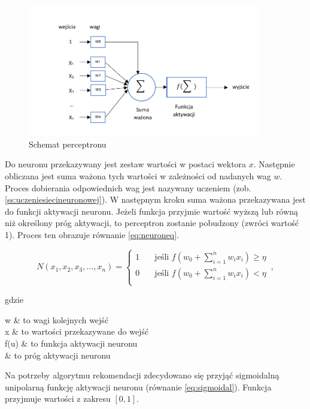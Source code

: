 \documentclass[twoside]{iisthesis}
\begin{document}
 		 \begin{figure}[!ht] 		 		 	
	 		 	\includegraphics[width=0.9\textwidth]{schematneuron}
	 		 	\caption{Schemat perceptronu}
	 		 	\label{fig:schematneuronu}
 		 \end{figure}
		 
		 Do neuronu przekazywany jest zestaw wartości w postaci wektora $x$. Następnie obliczana jest suma ważona tych wartości w zależności od nadanych wag $w$. Proces dobierania odpowiednich wag jest nazywany uczeniem (zob. \ref{ss:uczeniesiecineuronowej}). W następnym kroku suma ważona przekazywana jest do funkcji aktywacji neuronu. Jeżeli funkcja przyjmie wartość wyższą lub równą niż określony próg aktywacji, to perceptron zostanie pobudzony (zwróci wartość 1). Proces ten obrazuje równanie \ref{eq:neuroneq}.
		 
		 \begin{equation}
		 \label{eq:neuroneq}
		 N(x_1, x_2, x_3, \ldots, x_n) = 
			 \begin{cases}
			 1       & \quad \text{jeśli } f(w_0 + \sum_{i=1}^{n}w_ix_i) \geq \eta\\
			 0		 & \quad \text{jeśli } f(w_0 + \sum_{i=1}^{n}w_ix_i) < \eta\\
			 \end{cases}
		 \,,
		 \end{equation}
		 
		 gdzie
		 
		 \begin{conditions*}
		 	w & to wagi kolejnych wejść \\
		 	x & to wartości przekazywane do wejść \\
		 	f(u) & to funkcja aktywacji neuronu \\
		 	\eta & to próg aktywacji neuronu
		 \end{conditions*} 
		 
		 Na potrzeby algorytmu rekomendacji zdecydowano się przyjąć sigmoidalną unipolarną funkcję aktywacji neuronu (równanie \ref{eq:sigmoidal}). Funkcja przyjmuje wartości z zakresu $[0,1]$.
		 
\end{document}
